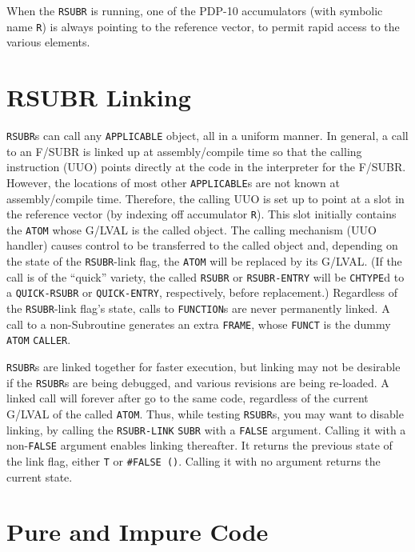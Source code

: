 \documentclass[a4paper]{scrbook}
\begin{document}
When the \texttt{RSUBR} is running, one of the PDP-10 accumulators (with symbolic name \texttt{R}) is always pointing to
the reference vector, to permit rapid access to the various elements.

\section{RSUBR Linking}\label{rsubr-linking}

\texttt{RSUBR}s can call any \texttt{APPLICABLE} object, all in a uniform manner. In general, a call to an F/SUBR is linked
up at assembly/compile time so that the calling instruction (UUO) points directly at the code in the interpreter for the
F/SUBR. However, the locations of most other \texttt{APPLICABLE}s are not known at assembly/compile time. Therefore, the
calling UUO is set up to point at a slot in the reference vector (by indexing off accumulator \texttt{R}). This slot
initially contains the \texttt{ATOM} whose G/LVAL is the called object. The calling mechanism (UUO handler) causes control
to be transferred to the called object and, depending on the state of the \texttt{RSUBR}-link flag, the \texttt{ATOM} will
be replaced by its G/LVAL. (If the call is of the ``quick'' variety, the called \texttt{RSUBR} or \texttt{RSUBR-ENTRY} will
be \texttt{CHTYPE}d to a \texttt{QUICK-RSUBR} or
\texttt{QUICK-ENTRY}, respectively, before replacement.) Regardless of the \texttt{RSUBR}-link
flag's state, calls to \texttt{FUNCTION}s are never permanently linked. A call to a non-Subroutine generates an extra
\texttt{FRAME}, whose \texttt{FUNCT} is the dummy \texttt{ATOM} \texttt{CALLER}.

\texttt{RSUBR}s are linked together for faster execution, but linking may not be desirable if the \texttt{RSUBR}s are being
debugged, and various revisions are being re-loaded. A linked call will forever after go to the same code, regardless of
the current G/LVAL of the called \texttt{ATOM}. Thus, while testing \texttt{RSUBR}s, you may want to disable linking, by
calling the \texttt{RSUBR-LINK} \texttt{SUBR} with a \texttt{FALSE} argument. Calling it
with a non-\texttt{FALSE} argument enables linking thereafter. It returns the previous state of the link flag, either
\texttt{T} or \texttt{\#FALSE\ ()}. Calling it with no argument returns the current state.

\section{Pure and Impure Code}\label{pure-and-impure-code}
\end{document}
